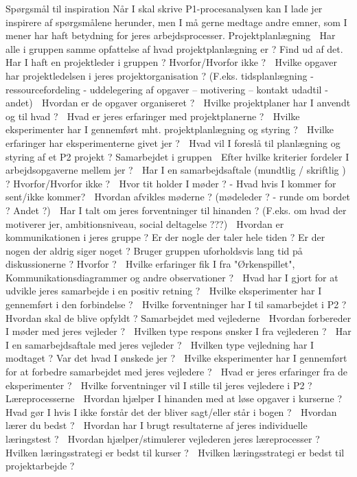\documentclass[oneside,a4paper,titlepage]{article}
\begin{document}
Spørgsmål til inspiration
Når I skal skrive P1-procesanalysen kan I lade jer inspirere af spørgsmålene herunder, men I må
gerne medtage andre emner, som I mener har haft betydning for jeres arbejdsprocesser.
Projektplanlægning
 Har alle i gruppen samme opfattelse af hvad projektplanlægning er ? Find ud af det.
 Har I haft en projektleder i gruppen ? Hvorfor/Hvorfor ikke ?
 Hvilke opgaver har projektledelsen i jeres projektorganisation ? (F.eks. tidsplanlægning -
ressourcefordeling - uddelegering af opgaver – motivering – kontakt udadtil - andet)
 Hvordan er de opgaver organiseret ?
 Hvilke projektplaner har I anvendt og til hvad ?
 Hvad er jeres erfaringer med projektplanerne ?
 Hvilke eksperimenter har I gennemført mht. projektplanlægning og styring ?
 Hvilke erfaringer har eksperimenterne givet jer ?
 Hvad vil I foreslå til planlægning og styring af et P2 projekt ?
Samarbejdet i gruppen
 Efter hvilke kriterier fordeler I arbejdsopgaverne mellem jer ?
 Har I en samarbejdsaftale (mundtlig / skriftlig ) ? Hvorfor/Hvorfor ikke ?
 Hvor tit holder I møder ? - Hvad hvis I kommer for sent/ikke kommer?
 Hvordan afvikles møderne ? (mødeleder ? - runde om bordet ? Andet ?)
 Har I talt om jeres forventninger til hinanden ? (F.eks. om hvad der motiverer jer,
ambitionsniveau, social deltagelse ???)
 Hvordan er kommunikationen i jeres gruppe ? Er der nogle der taler hele tiden ? Er der nogen
der aldrig siger noget ? Bruger gruppen uforholdsvis lang tid på diskussionerne ? Hvorfor ?
 Hvilke erfaringer fik I fra "Ørkenspillet", Kommunikationsdiagrammer og andre
observationer ?
 Hvad har I gjort for at udvikle jeres samarbejde i en positiv retning ?
 Hvilke eksperimenter har I gennemført i den forbindelse ?
 Hvilke forventninger har I til samarbejdet i P2 ? Hvordan skal de blive opfyldt ?
Samarbejdet med vejlederne
 Hvordan forbereder I møder med jeres vejleder ?
 Hvilken type respons ønsker I fra vejlederen ?
 Har I en samarbejdsaftale med jeres vejleder ?
 Hvilken type vejledning har I modtaget ? Var det hvad I ønskede jer ?
 Hvilke eksperimenter har I gennemført for at forbedre samarbejdet med jeres vejledere ?
 Hvad er jeres erfaringer fra de eksperimenter ?
 Hvilke forventninger vil I stille til jeres vejledere i P2 ?
Læreprocesserne
 Hvordan hjælper I hinanden med at løse opgaver i kurserne ?
 Hvad gør I hvis I ikke forstår det der bliver sagt/eller står i bogen ?
 Hvordan lærer du bedst ?
 Hvordan har I brugt resultaterne af jeres individuelle læringstest ?
 Hvordan hjælper/stimulerer vejlederen jeres læreprocesser ?
 Hvilken læringsstrategi er bedst til kurser ?
 Hvilken læringsstrategi er bedst til projektarbejde ?
\end{document}
